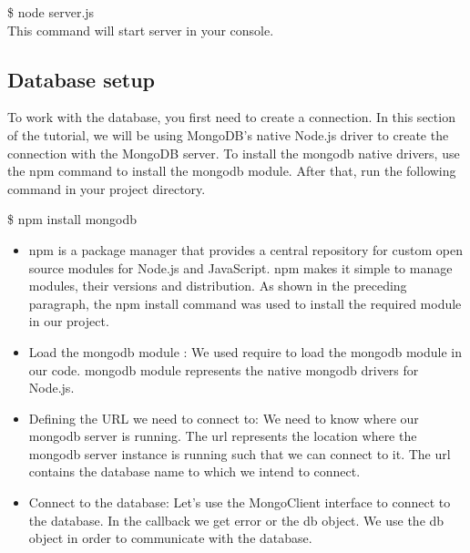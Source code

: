 	\$ node server.js \\

\noindent This command will start server in your console.\\

\subsection{Database setup}
To work with the database, you first need to create a connection. In this section of the tutorial, we will be using MongoDB’s native Node.js driver to create the connection with the MongoDB server. To install the mongodb native drivers, use the npm command to install the mongodb module. After that, run the following command in your project directory.

	\$ npm install mongodb \\

\begin{itemize}
\item npm is a package manager that provides a central repository for custom open source modules for Node.js and JavaScript. npm makes it simple to manage modules, their versions and distribution. As shown in the preceding paragraph, the npm install command was used to install the required module in our project.

\item Load the mongodb module : We used require to load the mongodb module in our code. mongodb module represents the native mongodb drivers for Node.js.

\item Defining the URL we need to connect to: We need to know where our mongodb server is running. The url represents the location where the mongodb server instance is running such that we can connect to it. The url contains the database name to which we intend to connect.

\item Connect to the database: Let’s use the MongoClient interface to connect to the database. In the callback we get error or the db object. We use the db object in order to communicate with the database.

\end{itemize}
